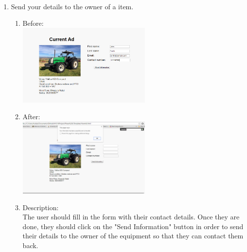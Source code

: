 \documentclass[11pt]{article}
\begin{document}
\begin{enumerate}
		\item Send your details to the owner of a item.
			\begin{enumerate}
				\item Before: \\
					\includegraphics[width=0.55\textwidth]{../Images/Tasks/Task10Before.png}
				\item After: \\
					\includegraphics[width=0.55\textwidth]{../Images/Tasks/Task10After.png}
					\item Description: \\The user should fill in the form with their contact details. Once they are done, they should click on the "Send Information" button in order to send their details to the owner of the equipment so that they can contact them back.
			\end{enumerate}
			
	\end{enumerate}
\end{document}
